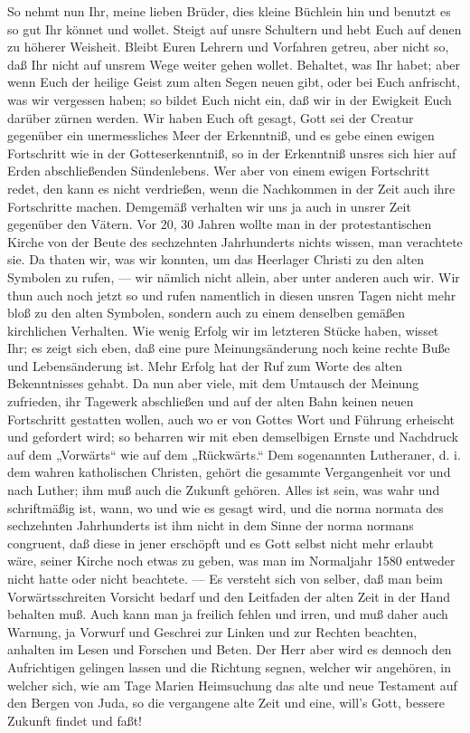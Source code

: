 So nehmt nun Ihr, meine lieben Brüder, dies kleine Büchlein hin und benutzt es so gut Ihr könnet und wollet. Steigt auf unsre Schultern und hebt Euch auf denen zu höherer Weisheit. Bleibt Euren Lehrern und Vorfahren getreu, aber nicht so, daß Ihr nicht auf unsrem Wege weiter gehen wollet. Behaltet, was Ihr habet; aber wenn Euch der heilige Geist zum alten Segen neuen gibt, oder bei Euch anfrischt, was wir vergessen haben; so bildet Euch nicht ein, daß wir in der Ewigkeit Euch darüber zürnen werden. Wir haben Euch oft gesagt, Gott sei der Creatur gegenüber ein unermessliches Meer der Erkenntniß, und es gebe einen ewigen Fortschritt wie in der Gotteserkenntniß, so in der Erkenntniß unsres sich hier auf Erden abschließenden Sündenlebens. Wer aber von einem ewigen Fortschritt redet, den kann es nicht verdrießen, wenn die Nachkommen in der Zeit auch ihre Fortschritte machen. Demgemäß verhalten wir uns ja auch in unsrer Zeit gegenüber den Vätern. Vor 20, 30 Jahren wollte man in der protestantischen Kirche von der Beute des sechzehnten Jahrhunderts nichts wissen, man verachtete sie. Da thaten wir, was wir konnten, um das Heerlager Christi zu den alten Symbolen zu rufen, — wir nämlich nicht allein, aber unter anderen auch wir. Wir thun auch noch jetzt so und rufen namentlich in diesen unsren Tagen nicht mehr bloß
zu den alten Symbolen, sondern auch zu einem denselben gemäßen kirchlichen Verhalten. Wie wenig Erfolg wir im letzteren Stücke haben, wisset Ihr; es zeigt sich eben, daß eine pure Meinungsänderung noch keine rechte Buße und Lebensänderung ist. Mehr Erfolg hat der Ruf zum Worte des alten Bekenntnisses gehabt. Da nun aber viele, mit dem Umtausch der Meinung zufrieden, ihr Tagewerk abschließen und auf der alten Bahn keinen neuen Fortschritt gestatten wollen, auch wo er von Gottes Wort und Führung erheischt und gefordert wird; so beharren wir mit eben demselbigen Ernste und Nachdruck auf dem „Vorwärts“ wie auf dem „Rückwärts.“ Dem sogenannten Lutheraner, d. i. dem wahren katholischen Christen, gehört die gesammte Vergangenheit vor und nach Luther; ihm muß auch die Zukunft gehören. Alles ist sein, was wahr und schriftmäßig ist, wann, wo und wie es gesagt wird, und die norma normata des sechzehnten Jahrhunderts ist ihm nicht in dem Sinne der norma normans congruent, daß diese in jener erschöpft und es Gott selbst nicht mehr erlaubt wäre, seiner Kirche noch etwas zu geben, was man im Normaljahr 1580 entweder nicht hatte oder nicht beachtete. — Es versteht sich von selber, daß man beim Vorwärtsschreiten Vorsicht bedarf und den Leitfaden der alten Zeit in der Hand behalten muß. Auch kann man ja freilich fehlen und irren, und muß daher auch Warnung, ja Vorwurf und Geschrei zur Linken und zur Rechten beachten, anhalten im Lesen und Forschen und Beten. Der Herr aber wird es dennoch den Aufrichtigen gelingen lassen und die Richtung segnen, welcher wir angehören, in welcher sich, wie am Tage Marien Heimsuchung das alte und neue Testament auf den Bergen von Juda, so die vergangene alte Zeit und eine, will's Gott, bessere Zukunft findet und faßt!

